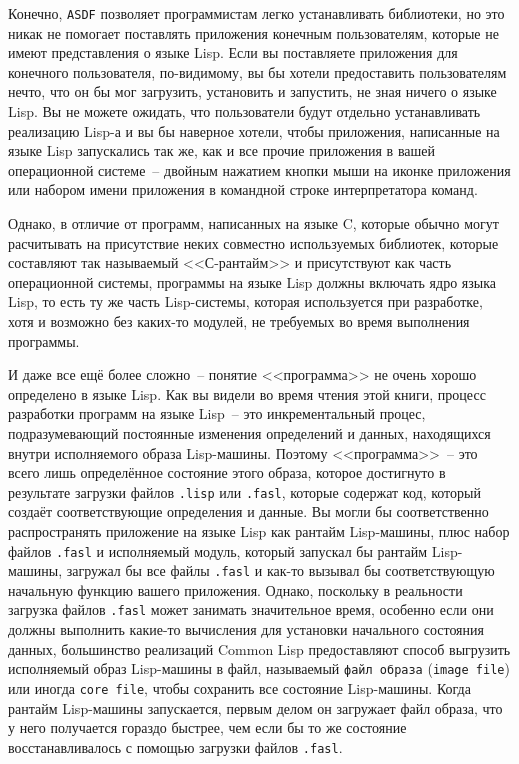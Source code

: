 Конечно, \lstinline{ASDF} позволяет программистам легко устанавливать библиотеки, но это никак
не помогает поставлять приложения конечным пользователям, которые не имеют представления о
языке Lisp. Если вы поставляете приложения для конечного пользователя, по-видимому, вы бы
хотели предоставить пользователям нечто, что он бы мог загрузить, установить и запустить,
не зная ничего о языке Lisp. Вы не можете ожидать, что пользователи будут отдельно
устанавливать реализацию Lisp-а и вы бы наверное хотели, чтобы приложения, написанные на
языке Lisp запускались так же, как и все прочие приложения в вашей операционной
системе~-- двойным нажатием кнопки мыши на иконке приложения или набором имени приложения
в командной строке интерпретатора команд.

Однако, в отличие от программ, написанных на языке C, которые обычно могут расчитывать на
присутствие неких совместно используемых библиотек, которые составляют так называемый
<<С-рантайм>> и присутствуют как часть операционной системы, программы на языке Lisp
должны включать ядро языка Lisp, то есть ту же часть Lisp-системы, которая используется
при разработке, хотя и возможно без каких-то модулей, не требуемых во время выполнения
программы.

И даже все ещё более сложно~-- понятие <<программа>> не очень хорошо определено в языке
Lisp. Как вы видели во время чтения этой книги, процесс разработки программ на языке
Lisp~-- это инкрементальный процес, подразумевающий постоянные изменения определений и
данных, находящихся внутри исполняемого образа Lisp-машины. Поэтому <<программа>>~-- это
всего лишь определённое состояние этого образа, которое достигнуто в результате загрузки
файлов \lstinline{.lisp} или \lstinline{.fasl}, которые содержат код, который создаёт
соответствующие определения и данные. Вы могли бы соответственно распространять приложение
на языке Lisp как рантайм Lisp-машины, плюс набор файлов \lstinline{.fasl} и исполняемый
модуль, который запускал бы рантайм Lisp-машины, загружал бы все файлы \lstinline{.fasl} и
как-то вызывал бы соответствующую начальную функцию вашего приложения. Однако, поскольку в
реальности загрузка файлов \lstinline{.fasl} может занимать значительное время, особенно если
они должны выполнить какие-то вычисления для установки начального состояния данных,
большинство реализаций Common Lisp предоставляют способ выгрузить исполняемый образ
Lisp-машины в файл, называемый \lstinline{файл образа} (\lstinline{image file}) или иногда
\lstinline{core file}, чтобы сохранить все состояние Lisp-машины. Когда рантайм Lisp-машины
запускается, первым делом он загружает файл образа, что у него получается гораздо быстрее,
чем если бы то же состояние восстанавливалось с помощью загрузки файлов \lstinline{.fasl}.

